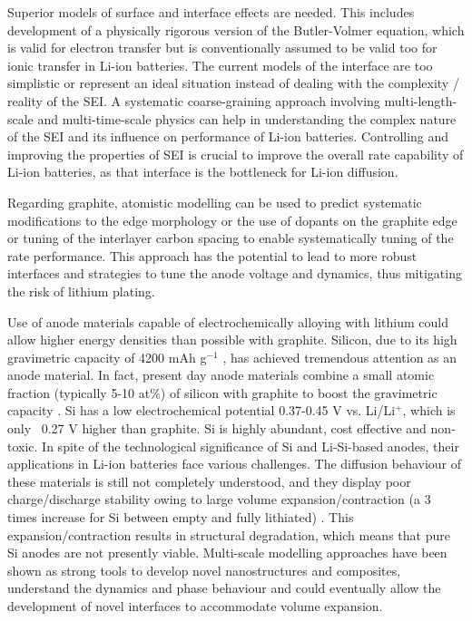 \documentclass[../main.tex]{subfiles}
\begin{document}
Superior models of surface and interface effects are needed. This includes development of a physically rigorous version of the Butler-Volmer equation, which is valid for electron transfer but is conventionally assumed to be valid too for ionic transfer in Li-ion batteries. The current models of the interface are too simplistic or represent an ideal situation instead of dealing with the complexity / reality of the SEI. A systematic coarse-graining approach involving multi-length-scale and multi-time-scale physics can help in understanding the complex nature of the SEI and its influence on performance of Li-ion batteries. Controlling and improving the properties of SEI is crucial to improve the overall rate capability of Li-ion batteries, as that interface is the bottleneck for Li-ion diffusion.

Regarding graphite, atomistic modelling can be used to predict systematic modifications to the edge morphology or the use of dopants on the graphite edge \cite{peng2020lithium,weydanz1994behavior,way1994effect} or tuning of the interlayer carbon spacing \cite{JI201866} to enable systematically tuning of the rate performance. This approach has the potential to lead to more robust interfaces and strategies to tune the anode voltage and dynamics, thus mitigating the risk of lithium plating.

Use of anode materials capable of electrochemically alloying with lithium could allow higher energy densities than possible with graphite. Silicon, due to its high gravimetric capacity of 4200 mAh g$^{-1}$ , has achieved tremendous attention as an anode material. \cite{larcher2007recent} In fact, present day anode materials combine a small atomic fraction (typically 5-10 at\%) of silicon with graphite to boost the gravimetric capacity \cite{asenbauer_success_2020}. Si has a low electrochemical potential 0.37-0.45 V vs. Li/Li$^+$, which is only ~0.27 V higher than graphite. \cite{feng-Small-2018}  Si is highly abundant, cost effective and non-toxic. \cite{nitta2014high, feng-Small-2018,Wagner-JPS-2019} In spite of the technological significance of Si and Li-Si-based anodes, their applications in Li-ion batteries face various challenges. The diffusion behaviour of these materials is still not completely understood, and they display poor charge/discharge stability owing to large volume expansion/contraction (a 3 times increase for Si between empty and fully lithiated) \cite{Wang-JPS-2014,Wagner-JPS-2019,feng-Small-2018}. This expansion/contraction results in structural degradation, which means that pure Si anodes are not presently viable. Multi-scale modelling approaches have been shown as strong tools to develop novel nanostructures and composites, understand the dynamics and phase behaviour and could eventually allow the development of novel interfaces to accommodate volume expansion.\cite{feng-Small-2018}  
\end{document}
